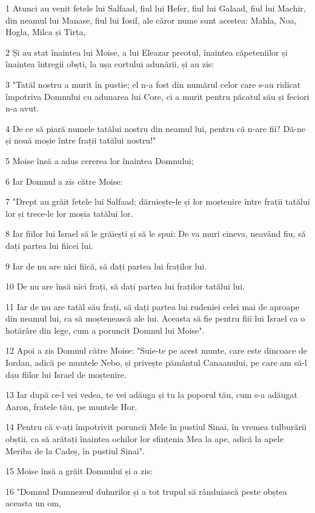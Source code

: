\par 1 Atunci au venit fetele lui Salfaad, fiul lui Hefer, fiul lui Galaad, fiul lui Machir, din neamul lui Manase, fiul lui Iosif, ale căror nume sunt acestea: Mahla, Noa, Hogla, Milca și Tirța,
\par 2 Și au stat înaintea lui Moise, a lui Eleazar preotul, înaintea căpeteniilor și înaintea întregii obști, la ușa cortului adunării, și au zis:
\par 3 "Tatăl nostru a murit în pustie; el n-a fost din numărul celor care s-au ridicat împotriva Domnului cu adunarea lui Core, ci a murit pentru păcatul său și feciori n-a avut.
\par 4 De ce să piară numele tatălui nostru din neamul lui, pentru că n-are fii? Dă-ne și nouă moșie între frații tatălui nostru!"
\par 5 Moise însă a adus cererea lor înaintea Domnului;
\par 6 Iar Domnul a zis către Moise:
\par 7 "Drept au grăit fetele lui Salfaad; dăruiește-le și lor moștenire între frații tatălui lor și trece-le lor moșia tatălui lor.
\par 8 Iar fiilor lui Israel să le grăiești și să le spui: De va muri cineva, neavând fiu, să dați partea lui fiicei lui.
\par 9 Iar de nu are nici fiică, să dați partea lui fraților lui.
\par 10 De nu are însă nici frați, să dați partea lui fraților tatălui lui.
\par 11 Iar de nu are tatăl său frați, să dați partea lui rudeniei celei mai de aproape din neamul lui, ca să moștenească ale lui. Aceasta să fie pentru fiii lui Israel ca o hotărâre din lege, cum a poruncit Domnul lui Moise".
\par 12 Apoi a zis Domnul către Moise: "Suie-te pe acest munte, care este dincoace de Iordan, adică pe muntele Nebo, și privește pământul Canaanului, pe care am să-l dau fiilor lui Israel de moștenire.
\par 13 Iar după ce-l vei vedea, te vei adăuga și tu la poporul tău, cum s-a adăugat Aaron, fratele tău, pe muntele Hor.
\par 14 Pentru că v-ați împotrivit poruncii Mele în pustiul Sinai, în vremea tulburării obștii, ca să arătați înaintea ochilor lor sfințenia Mea la ape, adică la apele Meriba de la Cadeș, în pustiul Sinai".
\par 15 Moise însă a grăit Domnului și a zis:
\par 16 "Domnul Dumnezeul duhurilor și a tot trupul să rânduiască peste obștea aceasta un om,
